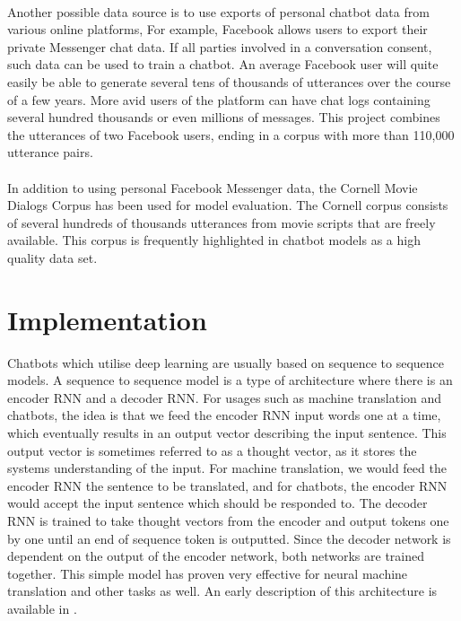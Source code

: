 \documentclass{article}
\begin{document}
\paragraph{}
Another possible data source is to use exports of personal chatbot data from
various online platforms, For example, Facebook allows users to export their
private Messenger chat data. If all parties involved in a conversation consent,
such data can be used to train a chatbot. An average Facebook user will quite
easily be able to generate several tens of thousands of utterances over the
course of a few years. More avid users of the platform can have chat logs
containing several hundred thousands or even millions of messages. This project
combines the utterances of two Facebook users, ending in a corpus with more
than 110,000 utterance pairs.

\paragraph{}
In addition to using personal Facebook Messenger data, the Cornell Movie
Dialogs Corpus \cite{cornell-corpus} has been used for model evaluation. The
Cornell corpus consists of several hundreds of thousands utterances from movie
scripts that are freely available. This corpus is frequently highlighted in
chatbot models as a high quality data set.

\section*{Implementation}
Chatbots which utilise deep learning are usually based on sequence to sequence
models. A sequence to sequence model is a type of architecture where there is
an encoder RNN and a decoder RNN. For usages such as machine translation and
chatbots, the idea is that we feed the encoder RNN input words one at a time,
which eventually results in an output vector describing the input sentence.
This output vector is sometimes referred to as a thought vector, as it stores
the systems understanding of the input. For machine translation, we would feed
the encoder RNN the sentence to be translated, and for chatbots, the encoder
RNN would accept the input sentence which should be responded to. The decoder
RNN is trained to take thought vectors from the encoder and output tokens
one by one until an end of sequence token is outputted. Since the decoder
network is dependent on the output of the encoder network, both networks are
trained together. This simple model has proven very effective for neural
machine translation and other tasks as well. An early description of this
architecture is available in \cite{Cho2014}.
\end{document}
